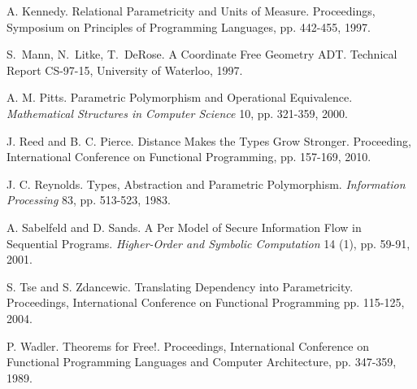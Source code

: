 \documentclass[preprint]{sigplanconf}
\theoremstyle{examplestyle}
\theoremstyle{restatementstyle}
\begin{document}
\begin{thebibliography}{12}
A. Kennedy. Relational Parametricity and Units of Measure.
Proceedings, Symposium on Principles of Programming Languages,
pp. 442-455, 1997.

S.~Mann, N.~Litke, T.~DeRose.  A Coordinate Free Geometry {ADT}.
Technical Report CS-97-15, University of Waterloo, 1997.

A. M. Pitts.  Parametric Polymorphism and Operational Equivalence.
{\em Mathematical Structures in Computer Science} 10, pp. 321-359,
2000.

J. Reed and B. C. Pierce.  Distance Makes the Types Grow Stronger.
Proceeding, International Conference on Functional Programming,
pp. 157-169, 2010.

J. C. Reynolds. Types, Abstraction and Parametric Polymorphism.
{\em Information Processing} 83, pp. 513-523, 1983.

A. Sabelfeld and D. Sands.  A Per Model of Secure Information Flow in
Sequential Programs.  {\em Higher-Order and Symbolic Computation} 14
(1), pp. 59-91, 2001.

S. Tse and S. Zdancewic.  Translating Dependency into Parametricity.
Proceedings, International Conference on Functional Programming pp.
115-125, 2004.

P. Wadler.  Theorems for Free!.  Proceedings, International Conference
on Functional Programming Languages and Computer Architecture,
pp. 347-359, 1989.

\end{thebibliography}

%
%


% 
\end{document}
